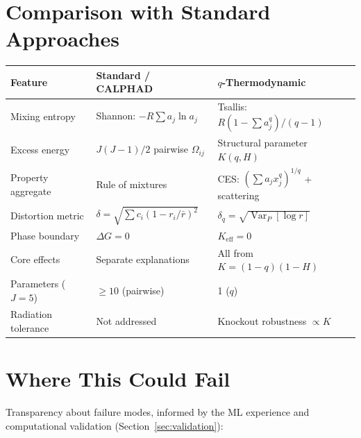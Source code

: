 \documentclass[12pt,letterpaper]{article}
\theoremstyle{definition}
\DeclareMathOperator{\Var}{Var}
\begin{document}
\section{Comparison with Standard Approaches}

\begin{center}
\begin{tabular}{@{}lll@{}}
\toprule
\textbf{Feature} & \textbf{Standard / CALPHAD} & \textbf{$q$-Thermodynamic} \\
\midrule
Mixing entropy & Shannon: $-R \sum a_j \ln a_j$ & Tsallis: $R(1 - \sum a_j^q)/(q-1)$ \\
Excess energy & $J(J-1)/2$ pairwise $\Omega_{ij}$ & Structural parameter $K(q, H)$ \\
Property aggregate & Rule of mixtures & CES: $(\sum a_j x_j^q)^{1/q}$ + scattering \\
Distortion metric & $\delta = \sqrt{\sum c_i(1-r_i/\bar{r})^2}$ & $\delta_q = \sqrt{\Var_P[\log r]}$ \\
Phase boundary & $\Delta G = 0$ & $K_{\mathrm{eff}} = 0$ \\
Core effects & Separate explanations & All from $K = (1-q)(1-H)$ \\
Parameters ($J = 5$) & $\geq 10$ (pairwise) & 1 ($q$) \\
Radiation tolerance & Not addressed & Knockout robustness $\propto K$ \\
\bottomrule
\end{tabular}
\end{center}


\section{Where This Could Fail}

Transparency about failure modes, informed by the ML experience and computational validation (Section~\ref{sec:validation}):
\end{document}
